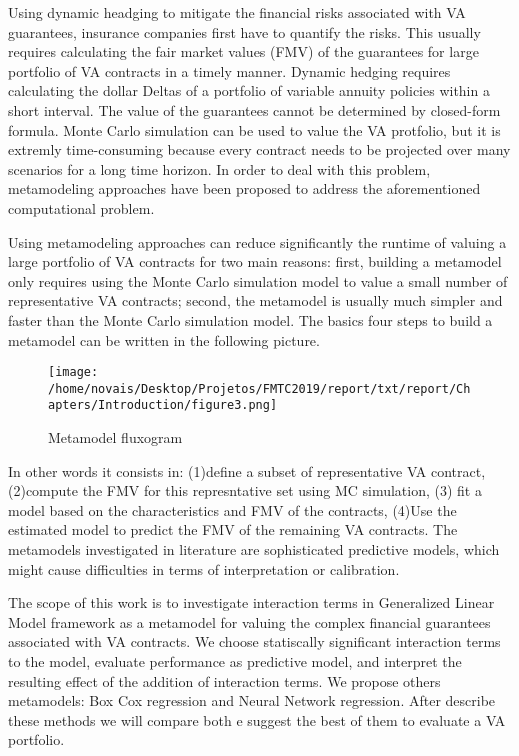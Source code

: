 Using dynamic headging to mitigate the financial risks associated with VA guarantees, insurance companies first have to quantify the risks. This usually requires calculating the fair market values (FMV) of the guarantees for large portfolio of VA contracts in a timely manner. Dynamic hedging requires calculating the dollar Deltas of a portfolio of variable annuity policies within a short interval. The value of the guarantees cannot be determined by closed-form formula. Monte Carlo simulation can be used to value the VA protfolio, but it is extremly time-consuming because every contract needs to be projected over many scenarios for a long time horizon. In order to deal with this problem, metamodeling approaches have been proposed to address the aforementioned computational problem.

Using metamodeling approaches can reduce significantly the runtime of valuing a large portfolio of VA contracts for two main reasons: first, building a metamodel only requires using the Monte Carlo simulation model to value a small number of representative VA contracts; second, the metamodel is usually much simpler and faster than the Monte Carlo simulation model. The basics four steps to build a metamodel can be written in the following picture.

\begin{figure}[H]
\begin{center}
  	\texttt{[image: /home/novais/Desktop/Projetos/FMTC2019/report/txt/report/Chapters/Introduction/figure3.png]}
    \caption{Metamodel fluxogram}
\end{center}
\end{figure}

In other words it consists in: (1)define a subset of representative VA contract, (2)compute the FMV for this represntative set using MC simulation, (3) fit a model based on the characteristics and FMV of the contracts, (4)Use the estimated model to predict the FMV of the remaining VA contracts. The metamodels investigated in literature are sophisticated predictive models, which might cause difficulties in terms of interpretation or calibration.

The scope of this work is to investigate interaction terms in Generalized Linear Model framework as a metamodel for valuing the complex financial guarantees associated with VA contracts. We choose statiscally significant interaction terms to the model, evaluate performance as predictive model, and interpret the resulting effect of the addition of interaction terms. We propose others metamodels: Box Cox regression and Neural Network regression. After describe these methods we will compare both e suggest the best of them to evaluate a VA portfolio.
